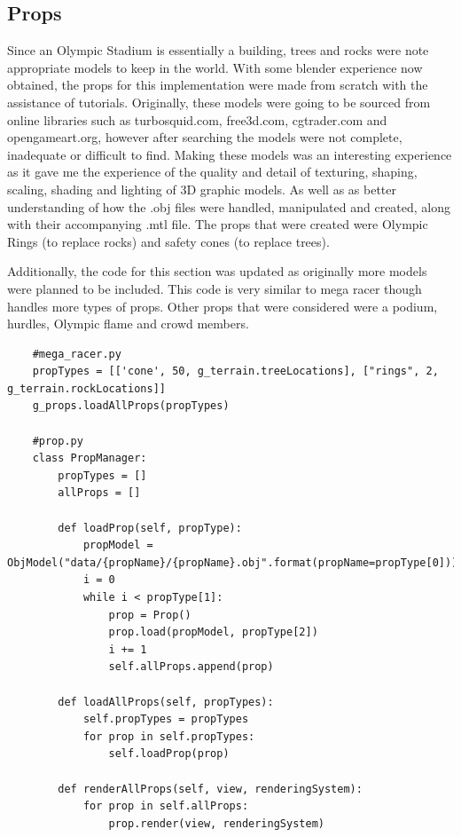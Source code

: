 \documentclass[a4 paper, 12pt]{article}
\begin{document}
\subsection{Props}
Since an Olympic Stadium is essentially a building, trees and rocks were note appropriate models to keep in the world. With some blender experience now obtained, the props for this implementation were made from scratch with the assistance of tutorials. Originally, these models were going to be sourced from online libraries such as turbosquid.com, free3d.com, cgtrader.com and opengameart.org, however after searching the models were not complete, inadequate or difficult to find. Making these models was an interesting experience as it gave me the experience of the quality and detail of texturing, shaping, scaling, shading and lighting of 3D graphic models. As well as as better understanding of how the .obj files were handled, manipulated and created, along with their accompanying .mtl file. The props that were created were Olympic Rings (to replace rocks) and safety cones (to replace trees). 

Additionally, the code for this section was updated as originally more models were planned to be included. This code is very similar to mega racer though handles more types of props. Other props that were considered were a podium, hurdles, Olympic flame and crowd members.

\begin{lstlisting}
    #mega_racer.py
    propTypes = [['cone', 50, g_terrain.treeLocations], ["rings", 2, g_terrain.rockLocations]]
    g_props.loadAllProps(propTypes)
    
    #prop.py
    class PropManager: 
        propTypes = []
        allProps = []    
    
        def loadProp(self, propType):
            propModel = ObjModel("data/{propName}/{propName}.obj".format(propName=propType[0]))
            i = 0
            while i < propType[1]:
                prop = Prop()
                prop.load(propModel, propType[2])         
                i += 1
                self.allProps.append(prop)
    
        def loadAllProps(self, propTypes):
            self.propTypes = propTypes
            for prop in self.propTypes:
                self.loadProp(prop)
    
        def renderAllProps(self, view, renderingSystem):
            for prop in self.allProps:
                prop.render(view, renderingSystem)    
    \end{lstlisting}
\end{document}
